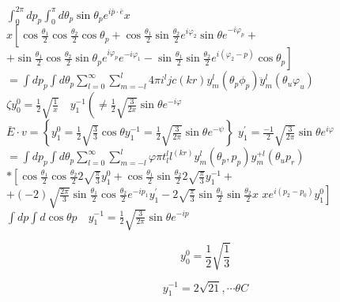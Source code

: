 \documentclass[10pt]{article}
\begin{document}
\(\int_{0}^{2 \pi} d p_{p} \int_{0}^{\pi} d \theta_{p} \sin \theta_{p} e^{i \bar{p} \cdot \bar{e}} x\)\\
\(x\left[\cos \frac{\theta_{1}}{2} \cos \frac{\theta_{2}}{2} \cos \theta_{p}+\cos \frac{\theta_{1}}{2} \sin \frac{\theta_{2}}{2} e^{i \varphi_{2}} \sin \theta e^{-i \varphi_{p}}+\right.\)\\
\(\left.+\sin \frac{\theta_{1}}{2} \cos \frac{\theta_{2}}{2} \sin \theta_{p} e^{i \varphi_{p}} e^{-i \varphi_{1}}-\sin \frac{\theta_{1}}{2} \sin \frac{\theta_{2}}{2} e^{i\left(\varphi_{2}-p\right)} \cos \theta_{p}\right]\)\\
\(=\int d p_{p} \int d \theta_{p} \sum_{l=0}^{\infty} \sum_{m=-l}^{l} 4 \pi i^{l} j c(k r) y_{m}^{l}\left(\theta_{p} \phi_{p}\right) \ddot{y}_{m}^{l}\left(\theta_{u} \varphi_{u}\right)\)\\
\(\zeta y_{0}^{0}=\frac{1}{2} \sqrt{\frac{1}{x}} \quad y_{1}^{-1}\left(\neq \frac{1}{2} \sqrt{\frac{3}{2 x}} \sin \theta e^{-i \varphi}\right.\)\\
\(\bar{E} \cdot v=\left\{y_{1}^{0}=\frac{1}{2} \sqrt{\frac{3}{3}} \cos \theta y_{1}^{-1}=\frac{1}{2} \sqrt{\frac{3}{2 \pi}} \sin \theta e^{-\psi}\right\}\) \(y_{1}^{\prime}=\frac{-1}{2} \sqrt{\frac{3}{2 \pi}} \sin \theta e^{i \varphi}\)\\
\(=\int d p_{p} \int d \theta_{p} \sum_{l=0}^{\infty} \sum_{m=-l}^{l} \varphi \pi t_{l}^{l} l^{(k r)} y_{m}^{l}\left(\theta_{p}, p_{p}\right) y_{m}^{+l}\left(\theta_{u} p_{r}\right)\)\\
\(*\left[\cos \frac{\theta_{1}}{2} \cos \frac{\theta_{2}}{2} 2 \sqrt{\frac{\pi}{3}} y_{1}^{0}+\cos \frac{\theta_{1}}{2} \sin \frac{\theta_{2}}{2} 2 \sqrt{\frac{\pi}{3}} y_{1}^{-1}+\right.\) \(+(-2) \sqrt{\frac{2 \pi}{3}} \sin \frac{\theta_{1}}{2} \cos \frac{\theta_{2}}{2} e^{-i p_{1}} y_{1}^{\prime}-2 \sqrt{\frac{\pi}{3}} \sin \frac{\theta_{1}}{2} \sin \frac{\theta_{2}}{2} x\) \(\left.x e^{i\left(p_{2}-p_{0}\right)} y_{1}^{0}\right]\)\\
\(\int d p \int d \cos \theta p \quad y_{1}^{-1}=\frac{1}{2} \sqrt{\frac{3}{2 \pi}} \sin \theta e^{-i p}\)

\[
y_{0}^{0}=\frac{1}{2} \sqrt{\frac{1}{3}}
\]

\[
y_{1}^{-1}=2 \sqrt{21}, \cdots \theta C
\]
\end{document}
